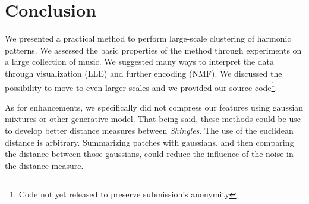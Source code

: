 \documentclass{article}
\begin{document}
\section{Conclusion}
We presented a practical method to perform large-scale clustering of
harmonic patterns. We assessed the basic properties of the method through
experiments on a large collection of music. We suggested many ways
to interpret the data through visualization (LLE) and further encoding
(NMF). We discussed the possibility to move to even larger scales
and we provided our source code\footnote{Code not yet released to preserve
submission's anonymity}.

As for enhancements, we specifically did not compress our features using
gaussian mixtures or other generative model. That being said, these methods
could be use to develop better distance measures between \textit{Shingles}.
The use of the euclidean distance is arbitrary. Summarizing patches
with gaussians, and then comparing the distance between those gaussians,
could reduce the influence of the noise in the distance measure.



\small



\end{document}
